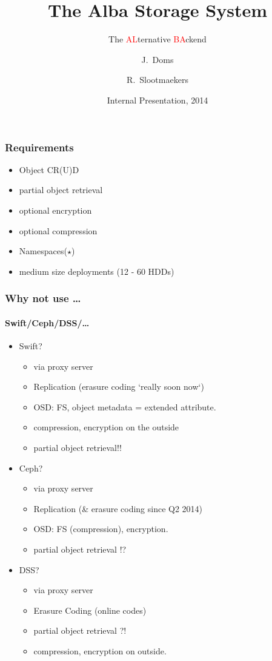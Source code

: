 \documentclass{beamer}
\title[Alba] %
{The Alba Storage System}
\subtitle{The \textcolor{red}{AL}ternative \textcolor{red}{BA}ckend}
\author[Slootmaekers, Doms] %
{J.~Doms \and R.~Slootmaekers}
\institute[CloudFounders] %
{
}
\date[Oct 2014] %
{Internal Presentation, 2014}
\begin{document}
\frame{\titlepage}
\begin{frame}
  \frametitle{Requirements}
  \begin{itemize}[<+->]
     \item Object CR(U)D
     \item partial object retrieval
     \item optional encryption
     \item optional compression
     \item Namespaces($\star$)
     \item medium size deployments \pause (12 - 60 HDDs)
  \end{itemize}
\end{frame}

\begin{frame}
  \frametitle{Why not use \ldots}
  \framesubtitle{Swift/Ceph/DSS/\ldots}
  \begin{itemize}[<+->]
    \item{Swift?}
      \begin{itemize}
        \item via proxy server
        \item Replication (erasure coding `really soon now`)
        \item OSD: FS, object metadata = extended attribute.
        \item compression, encryption on the outside
        \item partial object retrieval!!
      \end{itemize}
    \item{Ceph?}
        \begin{itemize}
          \item via proxy server
          \item Replication (\& erasure coding since Q2 2014)
          \item OSD: FS (compression), encryption.
          \item partial object retrieval !?
        \end{itemize}
    \item{DSS?}
        \begin{itemize}
          \item via proxy server
          \item Erasure Coding (online codes)
          \item partial object retrieval ?!
          \item compression, encryption on outside.
        \end{itemize}
  \end{itemize}

\end{frame}
\end{document}
